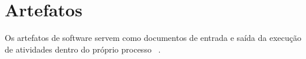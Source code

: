 


 

%
%
%
%
%




\section{Artefatos}

Os artefatos de software servem como documentos de entrada e saída da execução de atividades dentro do próprio processo ~\cite{sommerville2011}.

